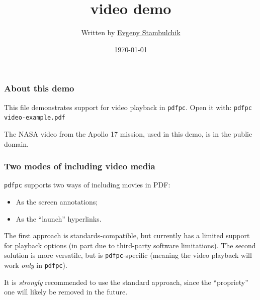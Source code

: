 \documentclass{beamer}
\title{\pdfpc video demo}
\author[E. Stambulchik]{Written by
                  \href{https://github.com/fnevgeny}{Evgeny Stambulchik}}
\date{\today}
\institute{}
\newcommand{\pdfpc}{\texttt{pdfpc}\xspace}
\newcommand{\opt}[1]{\texttt{#1}\xspace}
\begin{document}
\begin{frame}
  \titlepage
  \hypertarget{titlePage}{}
\end{frame}

\begin{frame}
  \frametitle{About this demo}

  This file demonstrates support for video playback in \pdfpc.
  Open it with: \opt{pdfpc video-example.pdf}
  
  \vfill
  
  {\small The NASA video from the Apollo 17 mission, used in this demo, is
  in the public domain.}
  
\end{frame}

\begin{frame}
  \frametitle{Two modes of including video media}

  \pdfpc supports two ways of including movies in PDF:

  \begin{itemize}
    \item As the screen annotations;
    \item As the ``launch'' hyperlinks.
  \end{itemize}

  \begin{block}{}
    The first approach is standards-compatible, but currently has a limited
    support for playback options (in part due to third-party software
    limitations). The second solution is more versatile, but is \pdfpc-specific
    (meaning the video playback will work {\em only} in \pdfpc).
  \end{block}

  \begin{alertblock}{}
    It is {\em strongly} recommended to use the standard approach, since the
    ``propriety'' one will likely be removed in the future.
  \end{alertblock}
\end{frame}
\end{document}
